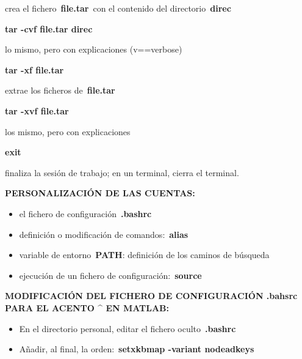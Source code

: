 \documentclass[
  letterpaper,
  DIV=11,
  numbers=noendperiod]{scrartcl}
\providecommand{\tightlist}{%
  \setlength{\itemsep}{0pt}\setlength{\parskip}{0pt}}\usepackage{longtable,booktabs,array}
\begin{document}
crea el fichero~\textbf{file.tar}~con el contenido del
directorio~\textbf{direc}

\textbf{tar -cvf file.tar direc}

lo mismo, pero con explicaciones (v==verbose)

\textbf{tar -xf file.tar}

extrae los ficheros de~\textbf{file.tar}

\textbf{tar -xvf file.tar}

los mismo, pero con explicaciones

\textbf{exit}

finaliza la sesión de trabajo; en un terminal, cierra el terminal.

\textbf{PERSONALIZACIÓN DE LAS CUENTAS:}

\begin{itemize}
\tightlist
\item
  el fichero de configuración~\textbf{.bashrc}
\item
  definición o modificación de comandos:~\textbf{alias}
\item
  variable de entorno~\textbf{PATH}: definición de los caminos de
  búsqueda
\item
  ejecución de un fichero de configuración:~\textbf{source}
\end{itemize}

\textbf{MODIFICACIÓN DEL FICHERO DE CONFIGURACIÓN .bahsrc PARA EL ACENTO
\^{} EN MATLAB:}

\begin{itemize}
\tightlist
\item
  En el directorio personal, editar el fichero oculto~\textbf{.bashrc}
\item
  Añadir, al final, la orden:~\textbf{setxkbmap -variant nodeadkeys}
\end{itemize}


\printbibliography
\end{document}
